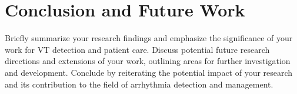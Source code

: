 \section{Conclusion and Future Work}

Briefly summarize your research findings and emphasize the significance of your work for VT detection and patient care.
Discuss potential future research directions and extensions of your work, outlining areas for further investigation and development.
Conclude by reiterating the potential impact of your research and its contribution to the field of arrhythmia detection and management.